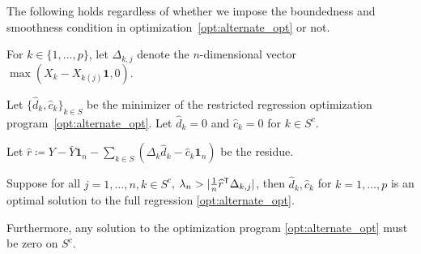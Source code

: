 \begin{theorem} 
The following holds regardless of whether we impose the boundedness and smoothness condition in optimization~\ref{opt:alternate_opt} or not.

For $k \in \{1,...,p\}$, let $\Delta_{k, j}$ denote the $n$-dimensional vector $\max( X_k - X_{k (j)} \mathbf{1}, 0)$. 

Let $\{\hat{d}_k, \hat{c}_k \}_{k \in S}$ be the minimizer of the restricted regression optimization program~\ref{opt:alternate_opt}. 
Let $\hat{d}_k = 0$ and $ \hat{c}_k = 0$ for $k \in S^c$.

Let $\hat{r} \coloneqq Y - \bar{Y} \mathbf{1}_n - \sum_{k \in S} (\Delta_k \hat{d}_k - \hat{c}_k \mathbf{1}_n) $ be the residue.

Suppose for all $j=1,...,n, k\in S^c$, $\lambda_n > | \frac{1}{n} \widehat{r}^{\mathsf{T}} \Delta_{k,j}|$, then $\hat{d}_k, \hat{c}_k$ for $k=1,...,p$ is an optimal solution to the full regression \ref{opt:alternate_opt}.

Furthermore, any solution to the optimization program \ref{opt:alternate_opt} must be zero on $S^c$.
\end{theorem}

